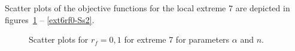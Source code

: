 \documentclass[review,times,3p,twocolumn,10pt]{elsarticle}
\begin{document}
Scatter plots of the objective functions for the local extreme 7 are depicted in figures~\ref{ext6rf0-an2} -- \ref{ext6rf0-Ss2}.

\begin{figure}[htb!]
\label{ext6rf0-an2}
\caption{Scatter plots for $r_f=0,1$ for extreme 7 for parameters $\alpha$ and $n$.}
\end{figure}
\end{document}
